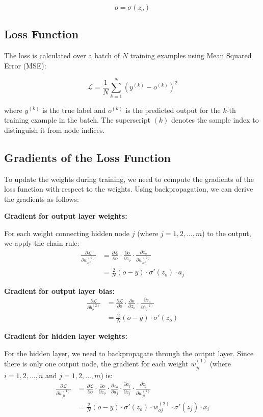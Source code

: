 \documentclass[12pt]{article}
\begin{document}
\[ o = \sigma\left(z_o\right) \]

\subsection{Loss Function}

The loss is calculated over a batch of $N$ training examples using Mean Squared Error (MSE):

\[ \mathcal{L} = \frac{1}{N} \sum_{k=1}^{N} (y^{(k)} - o^{(k)})^2 \]

where $y^{(k)}$ is the true label and $o^{(k)}$ is the predicted output for the $k$-th training example in the batch. The superscript $(k)$ denotes the sample index to distinguish it from node indices.

\subsection{Gradients of the Loss Function}
To update the weights during training, we need to compute the gradients of the loss function with respect to the weights. Using backpropagation, we can derive the gradients as follows:

\textbf{Gradient for output layer weights:}

For each weight connecting hidden node $j$ (where $j = 1, 2, \ldots, m$) to the output, we apply the chain rule:
\begin{align*}
\frac{\partial \mathcal{L}}{\partial w_{oj}^{(2)}} &= \frac{\partial \mathcal{L}}{\partial o} \cdot \frac{\partial o}{\partial z_o} \cdot \frac{\partial z_o}{\partial w_{oj}^{(2)}} \\
&= \frac{2}{N}(o - y) \cdot \sigma'(z_o) \cdot a_j
\end{align*}

\textbf{Gradient for output layer bias:}
\begin{align*}
\frac{\partial \mathcal{L}}{\partial b_o^{(2)}} &= \frac{\partial \mathcal{L}}{\partial o} \cdot \frac{\partial o}{\partial z_o} \cdot \frac{\partial z_o}{\partial b_o^{(2)}} \\
&= \frac{2}{N}(o - y) \cdot \sigma'(z_o)
\end{align*}

\textbf{Gradient for hidden layer weights:}

For the hidden layer, we need to backpropagate through the output layer. Since there is only one output node, the gradient for each weight $w_{ji}^{(1)}$ (where $i = 1, 2, \ldots, n$ and $j = 1, 2, \ldots, m$) is:
\begin{align*}
\frac{\partial \mathcal{L}}{\partial w_{ji}^{(1)}}
&= \frac{\partial \mathcal{L}}{\partial o} \cdot \frac{\partial o}{\partial z_o} \cdot \frac{\partial z_o}{\partial a_j} \cdot \frac{\partial a_j}{\partial z_j} \cdot \frac{\partial z_j}{\partial w_{ji}^{(1)}} \\
&= \frac{2}{N}(o - y) \cdot \sigma'(z_o) \cdot w_{oj}^{(2)} \cdot \sigma'(z_j) \cdot x_i
\end{align*}
\end{document}
